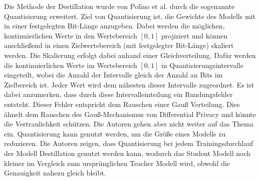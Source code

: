Die Methode der Destillation wurde von Polino et al. \cite{P-62} durch die sogenannte Quantisierung erweitert.
Ziel von Quantisierung ist, die Gewichte des Modells mit in einer festgelegten Bit-Länge anzugeben.
Dabei werden die möglichen, kontinuierlichen Werte in den Wertebereich $[0,1]$ projiziert und können anschließend in einen Zielwertebereich (mit festgelegter Bit-Länge) skaliert werden.
Die Skalierung erfolgt dabei anhand einer Gleichverteilung.
Dafür werden die kontinuierlichen Werte im Wertebereich $[0,1]$ in Quantisierungsintervalle eingeteilt, wobei die Anzahl der Intervalle gleich der Anzahl an Bits im Zielbereich ist.
Jeder Wert wird dem nähesten dieser Intervalle zugeordnet.
Es ist dabei anzumerken, dass durch diese Intervalleinteilung ein Rundungsfehler entsteht.
Dieser Fehler entspricht dem Rauschen einer Gauß Verteilung.
Dies ähnelt dem Rauschen des Gauß-Mechanismus von Differential Privacy und könnte die Vertraulichkeit schützen.
Die Autoren gehen aber nicht weiter auf das Thema ein.
Quantisierung kann genutzt werden, um die Größe eines Modells zu reduzieren.
Die Autoren zeigen, dass Quantisierung bei jedem Trainingsdurchlauf der Modell Destillation genutzt werden kann, wodurch das Student Modell noch kleiner im Vergleich zum ursprünglichen Teacher Modell wird, obwohl die Genauigkeit nahezu gleich bleibt.
